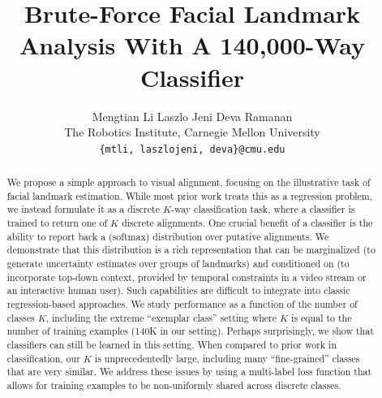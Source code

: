 \documentclass[letterpaper]{article} %
\newcommand{\ie}{\textit{i.e.}}
\begin{document}
\title{Brute-Force Facial Landmark Analysis With A 140,000-Way Classifier}

 \author{Mengtian Li \qquad Laszlo Jeni \qquad Deva Ramanan\\
 The Robotics Institute, Carnegie Mellon University\\
 {\tt\small \{mtli, laszlojeni, deva\}@cmu.edu}
 }

\maketitle

\begin{abstract}
We propose a simple approach to visual alignment, focusing on the illustrative task of facial landmark estimation. While most prior work treats this as a regression problem, we instead formulate it as a discrete $K$-way classification task, where a classifier is trained to return one of $K$ discrete alignments. One crucial benefit of a classifier is the ability to report back a (softmax) distribution over putative alignments. We demonstrate that this distribution is a rich representation that can be marginalized (to generate uncertainty estimates over groups of landmarks) and conditioned on (to incorporate top-down context, provided by temporal constraints in a video stream or an interactive human user). Such capabilities are difficult to integrate into classic regression-based approaches. We study performance as a function of the number of classes $K$, including the extreme ``exemplar class'' setting where $K$ is equal to the number of training examples (140K in our setting). Perhaps surprisingly, we show that classifiers can still be learned in this setting.
When compared to prior work in classification, our $K$ is unprecedentedly large, including many ``fine-grained'' classes that are very similar. We address these issues by using a multi-label loss function that allows for training examples to be non-uniformly shared across discrete classes.

\end{abstract}
\end{document}
